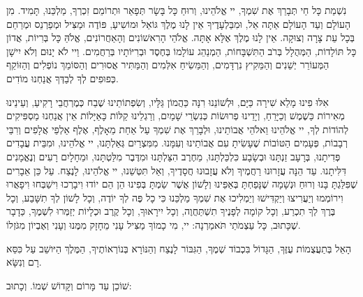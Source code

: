 נִשְׁמַת כָּל חַי תְּבָרֵךְ אֶת שִׁמְךָ, יי אֱלֹהֵינוּ, וְרוּחַ כָּל בָּשָׂר תְּפָאֵר וּתְרוֹמֵם זִכְרְךָ, מַלְכֵּנוּ, תָּמִיד. מִן הָעוֹלָם וְעַד הָעוֹלָם אַתָּה אֵל, וּמִבַּלְעָדֶיךָ אֵין לָנוּ מֶלֶךְ גּוֹאֵל וּמוֹשִיעַ, פּוֹדֶה וּמַצִּיל וּמְפַרְנֵס וּמְרַחֵם בְּכָל עֵת צָרָה וְצוּקָה. אֵין לָנוּ מֶלֶךְ אֶלָּא אָתָּה. אֱלֹהֵי הָרִאשׁוֹנִים וְהָאַחֲרוֹנִים, אֱלֹהַּ כָּל בְּרִיוֹת, אֲדוֹן כָּל תּוֹלָדוֹת, הַמְּהֻלָל בְּרֹב הַתִּשְׁבָּחוֹת, הַמְנַהֵג עוֹלָמוֹ בְּחֶסֶד וּבְרִיּוֹתָיו בְּרַחֲמִים. וַיי לֹא יָנוּם וְלֹא יִישָׁן הַמְּעוֹרֵר יְשֵׁנִים וְהַמֵּקִיץ נִרְדָּמִים, וְהַמֵּשִׂיחַ אִלְּמִים וְהַמַּתִּיר אֲסוּרִים וְהַסּוֹמֵךְ נוֹפְלִים וְהַזּוֹקֵף כְּפוּפִים לְךָ לְבַדְּךָ אֲנַחְנוּ מוֹדִים.

אִלּוּ פִינוּ מָלֵא שִׁירָה כַּיָּם, וּלְשׁוֹנֵנוּ רִנָּה כַּהֲמוֹן גַּלָּיו, וְשִׂפְתוֹתֵינוּ שֶׁבַח כְּמֶרְחֲבֵי רָקִיעַ, וְעֵינֵינוּ מְאִירוֹת כַּשֶׁמֶשׁ וְכַיָּרֵחַ, וְיָדֵינוּ פְרוּשׂוֹת כְּנִשְׂרֵי שָׁמַיִם, וְרַגְלֵינוּ קַלּוֹת כָּאַיָּלוֹת אֵין אֲנַחְנוּ מַסְפִּיקִים לְהוֹדוֹת לְךָ, יי אֱלֹהֵינוּ וֵאלֹהֵי אֲבוֹתֵינוּ, וּלְבָרֵךְ אֶת שִׁמְךָ עַל אַחַת מֵאָלֶף, אֶלֶף אַלְפֵי אֲלָפִים וְרִבֵּי רְבָבוֹת, פְּעָמִים הַטּוֹבוֹת שֶׁעָשִׂיתָ עִם אֲבוֹתֵינוּ וְעִמָּנוּ. מִמִּצְרַיִם גְּאַלְתָּנוּ, יי אֱלֹהֵינוּ, וּמִבֵּית עֲבָדִים פְּדִיתָנוּ, בְּרָעָב זַנְתָּנוּ וּבְשָׂבָע כִּלְכַּלְתָּנוּ, מֵחֶרֶב הִצַּלְתָּנוּ וּמִדֶּבֶר מִלַּטְתָּנוּ, וּמֵחָלָיִם רָעִים וְנֶאֱמָנִים דִּלִּיתָנוּ.
עַד הֵנָּה עֲזָרוּנוּ רַחֲמֶיךָ וְלֹא עֲזָבוּנוּ חֲסָדֶיךָ, וְאַל תִּטְּשֵׁנוּ, יי אֱלֹהֵינוּ, לָנֶצַח. עַל כֵּן אֵבָרִים שֶׁפִּלַּגְתָּ בָּנוּ וְרוּחַ וּנְשָׁמָה שֶׁנָּפַחְתָּ בְּאַפֵּינוּ וְלָשׁוֹן אֲשֶׁר שַׂמְתָּ בְּפִינוּ הֵן הֵם יוֹדוּ וִיבָרְכוּ וִישַׁבְּחוּ וִיפָאֲרוּ וִירוֹמְמוּ וְיַעֲרִיצוּ וְיַקְדִּישׁוּ וְיַמְלִיכוּ אֶת שִׁמְךָ מַלְכֵּנוּ כִּי כָל פֶּה לְךָ יוֹדֶה, וְכָל לָשׁוֹן לְךָ תִשָּׁבַע, וְכָל בֶּרֶךְ לְךָ תִכְרַע, וְכָל קוֹמָה לְפָנֶיךָ תִשְׁתַּחֲוֶה, וְכָל יִירָאוּךָ, וְכָל קֶרֶב וּכְלָיוֹת יְזַמְּרוּ לִשְׁמֶךָ, כַּדָבָר שֶׁכָּתוּב, כָּל עַצְמֹתַי תֹּאמַרְנָה: יי, מִי כָמוֹךָ מַצִּיל עָנִי מֵחָזָק מִמֶּנוּ וְעָנִי וְאֶבְיוֹן מִגֹּזְלוֹ.

\vspace{1em}

הָאֵל בְּתַעֲצֻמוֹת עֻזֶּךָ, הַגָּדוֹל בִּכְבוֹד שְׁמֶךָ, הַגִּבּוֹר לָנֶצַח וְהַנּוֹרָא בְּנוֹרְאוֹתֶיךָ, הַמֶּלֶךְ הַיּושֵׁב עַל כִּסֵּא רָם וְנִשָּׂא.

שׁוֹכֵן עַד מָּרוֹם וְקָּדוֹשׁ שְׁמוֹ. וְכָתוּב: 


